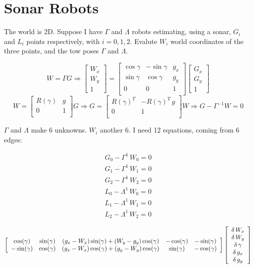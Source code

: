 \documentclass[a4paper]{article}
\newcommand{\cg}{\cos(\gamma)}
\newcommand{\sg}{\sin(\gamma)}
\begin{document}
\section*{Sonar Robots}
The world is 2D.
Suppose I have $\Gamma$ and $\Lambda$ robots estimating, using a sonar,
$G_i$ and $L_i$ points respectively, with $i = {0,1,2}$. Evalute $W_i$ world
coordinates of the three points, and the tow poses $\Gamma$ and $\Lambda$.

\[
W = \Gamma G \Rightarrow
\left[
\begin{array}{c}
W_x\\
W_y\\
1
\end{array}\right]
=
\left[
\begin{array}{ccc}
\cos{\gamma} & -\sin{\gamma} & g_x\\
\sin{\gamma} & \cos{\gamma} & g_y\\
0 & 0 & 1\\
\end{array}\right]
\left[
\begin{array}{c}
G_x\\
G_y\\
1
\end{array}\right]
\]
\[
W =
\left[
\begin{array}{cc}
R(\gamma) & g\\
0 & 1\\
\end{array}
\right] G
\Rightarrow
G =
\left[
\begin{array}{cc}
R(\gamma)^T & -R(\gamma)^T\,g\\
0 & 1\\
\end{array}
\right] W
\Rightarrow
G - \Gamma^{-1} W = 0
\]

$\Gamma$ and $\Lambda$ make 6 unknowns. $W_i$ another 6.
I need 12 equations, coming from 6 edges:

\begin{align}
G_0 - \Gamma^1\, W_0 = 0\nonumber\\
G_1 - \Gamma^1\, W_1 = 0\nonumber\\
G_2 - \Gamma^1\, W_2 = 0\nonumber\\
L_0 - \Lambda^1\, W_0 = 0\nonumber\\
L_1 - \Lambda^1\, W_1 = 0\nonumber\\
L_2 - \Lambda^1\, W_2 = 0\nonumber
\end{align}

\[
\left[
\begin{array}{c c c c c}
 \cg & \sg & (g_x-W_x)\sg+(W_y-g_y)\cg & -\cg & -\sg \\
-\sg & \cg & (g_x-W_x)\cg+(g_y-W_y)\cg & \sg & -\cg
\end{array}
\right]
\left[
\begin{array}{c}
\delta\, W_{x}\\ %
\delta\, W_{y}\\ %
\delta\, \gamma\\ %
\delta\, g_x\\    %
\delta\, g_y\\    %
\end{array}
\right]
\]
\end{document}
